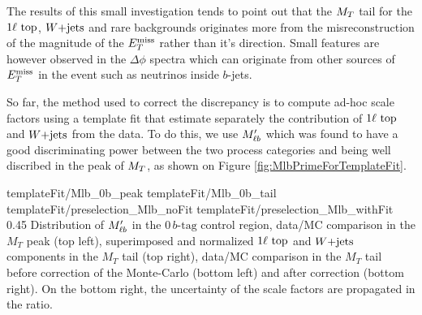     The results of this small investigation tends to point out that the $M_T$ tail for
    the $1\ell~\text{top}$, $\text{$W$+jets}$ and rare backgrounds originates more from the
    misreconstruction of the magnitude of the $E_T^\text{miss}$ rather than it's direction. Small
    features are however observed in the $\Delta \phi$ spectra which can originate from
    other sources of $E_T^\text{miss}$ in the event such as neutrinos inside $b$-jets.

    So far, the method used to correct the discrepancy is to compute ad-hoc scale factors
    using a template fit that estimate separately the contribution of $1\ell~\text{top}$ and
    $\text{$W$+jets}$ from the data. To do this, we use $M'_{\ell b}$ which was found to have a good
    discriminating power between the two process categories and being well discribed in
    the peak of $M_T$, as shown on Figure \ref{fig:MlbPrimeForTemplateFit}.

                          {templateFit/Mlb_0b_peak}
                          {templateFit/Mlb_0b_tail}
                          {templateFit/preselection_Mlb_noFit}
                          {templateFit/preselection_Mlb_withFit}
                          {0.45}
                          {Distribution of $M'_{\ell b}$ in the $0\, b\text{-tag}$ control region, data/MC comparison in the $M_T$ peak (top left), superimposed and normalized $1\ell~\text{top}$ and $\text{$W$+jets}$ components in the $M_T$ tail (top right), data/MC comparison in the $M_T$ tail before correction of the Monte-Carlo (bottom left) and after correction (bottom right). On the bottom right, the uncertainty of the scale factors are propagated in the ratio.}

